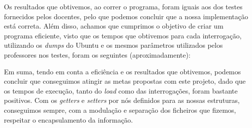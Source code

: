 \documentclass[a4paper, 11pt, oneside]{article}
\begin{document}
Os resultados que obtivemos, ao correr o programa, foram iguais aos dos testes fornecidos pelos docentes,
pelo que podemos concluir que a nossa implementação está correta.
Além disso, achamos que cumprimos o objetivo de criar um programa eficiente,
visto que os tempos que obtivemos para cada interrogação, utilizando os \textit{dumps} do
Ubuntu e os mesmos parâmetros utilizados pelos professores nos testes, foram os seguintes (aproximadamente):


Em suma, tendo em conta a eficiência e os resultados que obtivemos, podemos concluir
que conseguimos atingir as metas propostas com este projeto, dado que os tempos de
execução, tanto do \textit{load} como das interrogações, foram bastante positivos.
Com os \textit{getters} e \textit{setters} por nós definidos para as nossas estruturas,
conseguimos sempre, com a modulação e separação dos ficheiros que fizemos, respeitar o encapsulamento da informação.
\end{document}
